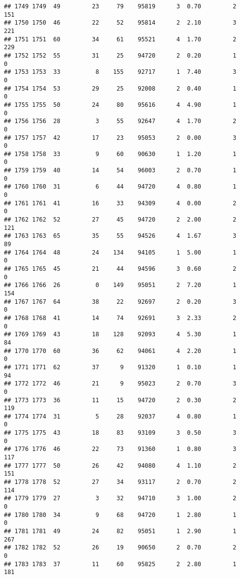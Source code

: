\documentclass[
]{article}
\begin{document}
\begin{verbatim}
## 1749 1749  49         23     79    95819      3  0.70         2      151
## 1750 1750  46         22     52    95814      2  2.10         3      221
## 1751 1751  60         34     61    95521      4  1.70         2      229
## 1752 1752  55         31     25    94720      2  0.20         1        0
## 1753 1753  33          8    155    92717      1  7.40         3        0
## 1754 1754  53         29     25    92008      2  0.40         1        0
## 1755 1755  50         24     80    95616      4  4.90         1        0
## 1756 1756  28          3     55    92647      4  1.70         2        0
## 1757 1757  42         17     23    95053      2  0.00         3        0
## 1758 1758  33          9     60    90630      1  1.20         1        0
## 1759 1759  40         14     54    96003      2  0.70         1        0
## 1760 1760  31          6     44    94720      4  0.80         1        0
## 1761 1761  41         16     33    94309      4  0.00         2        0
## 1762 1762  52         27     45    94720      2  2.00         2      121
## 1763 1763  65         35     55    94526      4  1.67         3       89
## 1764 1764  48         24    134    94105      1  5.00         1        0
## 1765 1765  45         21     44    94596      3  0.60         2        0
## 1766 1766  26          0    149    95051      2  7.20         1      154
## 1767 1767  64         38     22    92697      2  0.20         3        0
## 1768 1768  41         14     74    92691      3  2.33         2        0
## 1769 1769  43         18    128    92093      4  5.30         1       84
## 1770 1770  60         36     62    94061      4  2.20         1        0
## 1771 1771  62         37      9    91320      1  0.10         1       94
## 1772 1772  46         21      9    95023      2  0.70         3        0
## 1773 1773  36         11     15    94720      2  0.30         2      119
## 1774 1774  31          5     28    92037      4  0.80         1        0
## 1775 1775  43         18     83    93109      3  0.50         3        0
## 1776 1776  46         22     73    91360      1  0.80         3      117
## 1777 1777  50         26     42    94080      4  1.10         2      151
## 1778 1778  52         27     34    93117      2  0.70         2      114
## 1779 1779  27          3     32    94710      3  1.00         2        0
## 1780 1780  34          9     68    94720      1  2.80         1        0
## 1781 1781  49         24     82    95051      1  2.90         1      267
## 1782 1782  52         26     19    90650      2  0.70         2        0
## 1783 1783  37         11     60    95825      2  2.80         1      181

\end{verbatim}
\end{document}
